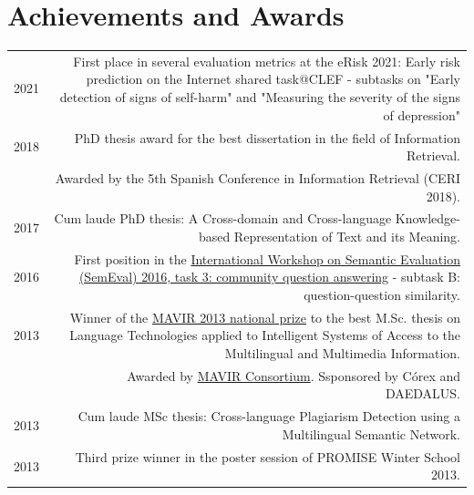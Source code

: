 \documentclass[10pt]{article}
\begin{document}
\section*{Achievements and Awards}
\begin{tabular}{L!{\VRule}R}
  2021 & First place in several evaluation metrics at the eRisk 2021: Early risk prediction on the Internet shared task@CLEF - subtasks on "Early detection of signs of self-harm" and "Measuring the severity of the signs of depression"\vspace{5pt}\\
  2018 & PhD thesis award for the best dissertation in the field of Information Retrieval.\vspace{5pt}\\
	   &\scriptsize{Awarded by the 5th Spanish Conference in Information Retrieval (CERI 2018).}\vspace{5pt}\\
  2017 & Cum laude PhD thesis: A Cross-domain and Cross-language Knowledge-based Representation of Text and its Meaning.\vspace{5pt}\\
  2016 & First position in the \href{http://alt.qcri.org/semeval2016/task3/}{International Workshop on Se\-man\-tic Evaluation (SemEval) 2016, task 3: community question answering} - subtask B: question-question similarity.\vspace{5pt}\\
  2013 & Winner of the \href{http://www.mavir.net/premio/182-resuelto-premio-mavir-2013}{MAVIR 2013 national prize} to the best M.Sc. thesis on Language Technologies applied to Intelligent Systems of Access
  to the Multilingual and Multimedia Information.\vspace{5pt}\\
  &\scriptsize{Awarded by \href{http://www.mavir.net/}{MAVIR Consortium}. Ssponsored by C{\'o}rex and DAEDALUS.}\vspace{5pt}\\
  2013 & Cum laude MSc thesis: Cross-language Plagiarism Detection using a Multilingual Se\-man\-tic Network.\vspace{5pt}\\

  2013 & Third prize winner in the poster session of PROMISE Winter School 2013.\vspace{5pt}\\
\end{tabular}
\end{document}
